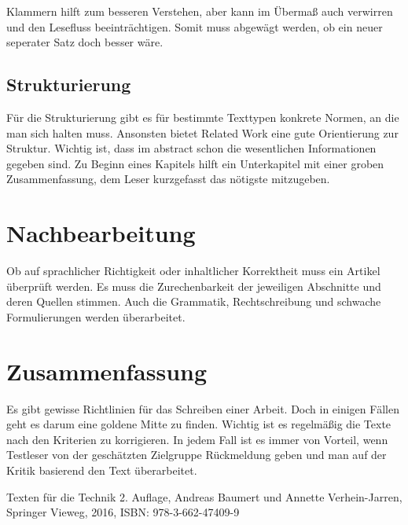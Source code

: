 \documentclass{article}
\begin{document}
Klammern hilft zum besseren Verstehen, aber kann im Übermaß auch verwirren und den Lesefluss beeinträchtigen. Somit muss abgewägt werden, ob ein neuer seperater Satz doch besser wäre.

\subsection{Strukturierung}
Für die Strukturierung gibt es für bestimmte Texttypen konkrete Normen, an die man sich halten muss. Ansonsten bietet Related Work eine gute Orientierung zur Struktur. Wichtig ist, dass im abstract schon die wesentlichen Informationen gegeben sind. Zu Beginn eines Kapitels hilft ein Unterkapitel mit einer groben Zusammenfassung, dem Leser kurzgefasst das nötigste mitzugeben.

\section{Nachbearbeitung}
Ob auf sprachlicher Richtigkeit oder inhaltlicher Korrektheit muss ein Artikel überprüft werden. Es muss die Zurechenbarkeit der jeweiligen Abschnitte und deren Quellen stimmen. Auch die Grammatik, Rechtschreibung und schwache Formulierungen werden überarbeitet.
\section{Zusammenfassung}
Es gibt gewisse Richtlinien für das Schreiben einer Arbeit. Doch in einigen Fällen geht es darum eine goldene Mitte zu finden. 
Wichtig ist es regelmäßig die Texte nach den Kriterien zu korrigieren.
In jedem Fall ist es immer von Vorteil, wenn Testleser von der geschätzten Zielgruppe Rückmeldung geben und man auf der Kritik basierend den Text überarbeitet.
\begin{thebibliography}{1}
Texten für die Technik 2. Auflage, Andreas Baumert und Annette Verhein-Jarren, Springer Vieweg, 2016, ISBN: 978-3-662-47409-9
\end{thebibliography}
\end{document}
